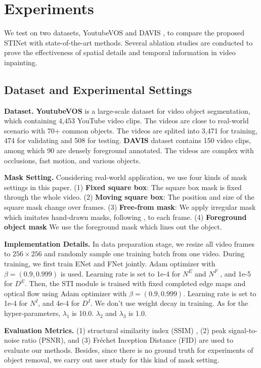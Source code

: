\section{Experiments}
We test on two datasets, YoutubeVOS \cite{xu2018youtube} and DAVIS \cite{davis_2017}, to compare the proposed STINet with state-of-the-art methods. Several ablation studies are conducted to prove the effectiveness of spatial details and temporal information in video inpainting.
\subsection{Dataset and Experimental Settings}
\textbf{Dataset.} 
\textbf{YoutubeVOS} is a large-scale dataset for video object segmentation, which containing 4,453 YouTube video clips. The videos are close to real-world scenario with 70+ common objects. The videos are splited into 3,471 for training, 474 for validating and 508 for testing.
\textbf{DAVIS} dataset contains 150 video clips, among which 90 are densely foreground annotated. The videos are complex with occlusions, fast motion, and various objects. 


\noindent \textbf{Mask Setting.} Considering real-world application, we use four kinds of mask settings in this paper. (1) \textbf{Fixed square box}: The square box mask is fixed through the whole video. (2) \textbf{Moving square box}: The position and size of the square mask change over frames. (3) \textbf{Free-from mask}: We apply irregular mask which imitates hand-drawn masks, following \cite{liu2018partialinpainting}, to each frame. (4) \textbf{Foreground object mask} We use the foreground mask which lines out the object.

\noindent \textbf{Implementation Details.} In data preparation stage, we resize all video frames to $256\times256$ and randomly sample one training batch from one video. 
During training, we first train ENet and FNet jointly. Adam optimizer with $\beta=(0.9, 0.999)$ is used. Learning rate is set to 1e-4 for $N^E$ and $N^F$ , and 1e-5 for $D^E$. Then, the STI module is trained with fixed completed edge maps and optical flow using Adam optimizer with $\beta=(0.9, 0.999)$. Learning rate is set to 1e-4 for $N^I$, and 4e-4 for $D^I$. We don't use weight decay in training.
As for the hyper-parameters, $\lambda_1$ is 10.0. $\lambda_2$ and $\lambda_3$ is 1.0.

\noindent \textbf{Evaluation Metrics.} (1) structural similarity index (SSIM) \cite{wang2004image}, (2) peak signal-to-noise ratio (PSNR), and (3) Fr{\'e}chet Inception Distance (FID) \cite{heusel2017gans} are used to evaluate our methods. 
Besides, since there is no ground truth for experiments of object removal, we carry out user study for this kind of mask setting. 


